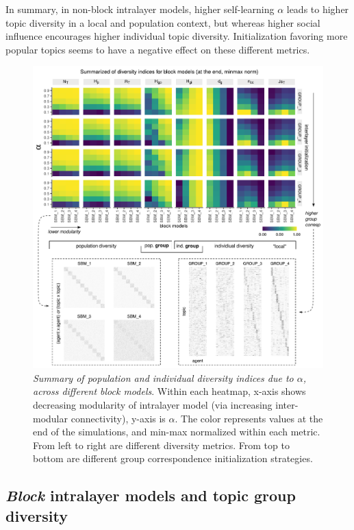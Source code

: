 \documentclass{svproc}
\begin{document}
In summary, in non-block intralayer models, higher self-learning $\alpha$ leads to higher topic diversity in a local and population context, but whereas higher social influence encourages higher individual topic diversity. Initialization favoring more popular topics seems to have a negative effect on these different metrics.

\begin{figure}[!ht]
    \centering
    \includegraphics[width=\textwidth]{Fig3.pdf}
    \caption{
    \textit{Summary  of  population  and  individual  diversity  indices  due  to $\alpha$,  across  different  block  models}. Within each heatmap, x-axis shows decreasing modularity of intralayer model (via increasing inter-modular connectivity), y-axis is $\alpha$. The color represents values at the end of the simulations, and min-max normalized within each metric. From left to right are different diversity metrics. From top to bottom are different group correspondence initialization strategies.
    }
    \label{fig:3}
\end{figure}


\subsection{\textit{Block} intralayer models and topic group diversity}
\label{results-block}
\end{document}
